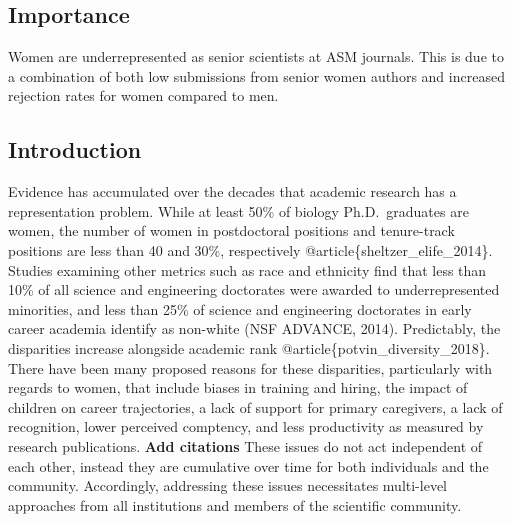 \documentclass[11pt,]{article}
\begin{document}
\subsection{Importance}\label{importance}

Women are underrepresented as senior scientists at ASM journals. This is
due to a combination of both low submissions from senior women authors
and increased rejection rates for women compared to men.

\subsection{Introduction}\label{introduction}

Evidence has accumulated over the decades that academic research has a
representation problem. While at least 50\% of biology Ph.D.~graduates
are women, the number of women in postdoctoral positions and
tenure-track positions are less than 40 and 30\%, respectively
@article\{sheltzer\_elife\_2014\}. Studies examining other metrics such
as race and ethnicity find that less than 10\% of all science and
engineering doctorates were awarded to underrepresented minorities, and
less than 25\% of science and engineering doctorates in early career
academia identify as non-white (NSF ADVANCE, 2014). Predictably, the
disparities increase alongside academic rank
@article\{potvin\_diversity\_2018\}. There have been many proposed
reasons for these disparities, particularly with regards to women, that
include biases in training and hiring, the impact of children on career
trajectories, a lack of support for primary caregivers, a lack of
recognition, lower perceived comptency, and less productivity as
measured by research publications. \textbf{Add citations} These issues
do not act independent of each other, instead they are cumulative over
time for both individuals and the community. Accordingly, addressing
these issues necessitates multi-level approaches from all institutions
and members of the scientific community.
\end{document}
